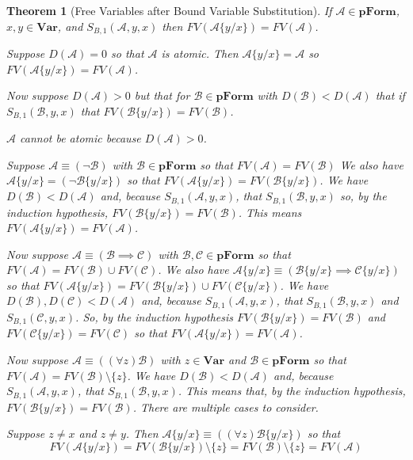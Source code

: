 \documentclass[12pt]{article}
\theoremstyle{break}
\theoremstyle{break}
\newtheorem{theorem}{Theorem}[section]
\theoremstyle{break}
\theoremstyle{break}
\theoremstyle{break}
\newtheorem{informal definition}[definition]{Informal Definition}
\newcommand{\mc}[1]{\mathcal{#1}}
\begin{document}
\begin{theorem}[Free Variables after Bound Variable Substitution]
If $\mc{A}\in\textbf{pForm}$, $x, y\in\textbf{Var}$, and $S_{B,1}(\mc{A}, y, x)$ then $FV(\mc{A}\{y/x\}) = FV(\mc{A})$.

Suppose $D(\mc{A})=0$ so that $\mc{A}$ is atomic. Then $\mc{A}\{y/x\} = \mc{A}$ so $FV(\mc{A}\{y/x\}) = FV(\mc{A})$.

Now suppose $D(\mc{A})>0$ but that for $\mc{B}\in\textbf{pForm}$ with $D(\mc{B})<D(\mc{A})$ that if $S_{B,1}(\mc{B}, y, x)$ that $FV(\mc{B}\{y/x\}) = FV(\mc{B})$.

$\mc{A}$ cannot be atomic because $D(\mc{A})>0$.

Suppose $\mc{A} \equiv (\lnot \mc{B})$ with $\mc{B}\in\textbf{pForm}$ so that $FV(\mc{A}) = FV(\mc{B})$
We also have $\mc{A}\{y/x\} = (\lnot \mc{B}\{y/x\})$ so that $FV(\mc{A}\{y/x\}) = FV(\mc{B}\{y/x\})$.
We have $D(\mc{B})<D(\mc{A})$ and, because $S_{B,1}(\mc{A}, y,x )$, that $S_{B, 1}(\mc{B}, y, x)$ so, by the induction hypothesis, $FV(\mc{B}\{y/x\}) = FV(\mc{B})$.
This means $FV(\mc{A}\{y/x\}) = FV(\mc{A})$.

Now suppose $\mc{A}\equiv (\mc{B}\implies \mc{C})$ with $\mc{B}, \mc{C}\in\textbf{pForm}$ so that $FV(\mc{A}) = FV(\mc{B})\cup FV(\mc{C})$.
We also have $\mc{A}\{y/x\} \equiv (\mc{B}\{y/x\} \implies \mc{C}\{y/x\})$ so that $FV(\mc{A}\{y/x\}) = FV(\mc{B}\{y/x\}) \cup FV(\mc{C}\{y/x\})$.
We have $D(\mc{B}), D(\mc{C}) < D(\mc{A})$ and, because $S_{B,1}(\mc{A}, y, x)$, that $S_{B,1}(\mc{B}, y, x)$ and $S_{B,1}(\mc{C}, y, x)$.
So, by the induction hypothesis $FV(\mc{B}\{y/x\}) = FV(\mc{B})$ and $FV(\mc{C}\{y/x\}) = FV(\mc{C})$ so that $FV(\mc{A}\{y/x\}) = FV(\mc{A})$.

Now suppose $\mc{A} \equiv ((\forall z)\mc{B})$ with $z\in\textbf{Var}$ and $\mc{B}\in\textbf{pForm}$ so that $FV(\mc{A}) = FV(\mc{B})\setminus \{z\}$.
We have $D(\mc{B}) < D(\mc{A})$ and, because $S_{B,1}(\mc{A}, y, x)$, that $S_{B, 1}(\mc{B}, y, x)$.
This means that, by the induction hypothesis, $FV(\mc{B}\{y/x\}) = FV(\mc{B})$.
There are multiple cases to consider.

Suppose $z \not = x$ and $z\not = y$.
Then $\mc{A}\{y/x\} \equiv ((\forall z) \mc{B}\{y/x\})$ so that
$$
FV(\mc{A}\{y/x\}) = FV(\mc{B}\{y/x\})\setminus\{z\}=FV(\mc{B})\setminus\{z\} = FV(\mc{A})
$$


\end{theorem}
\end{document}
